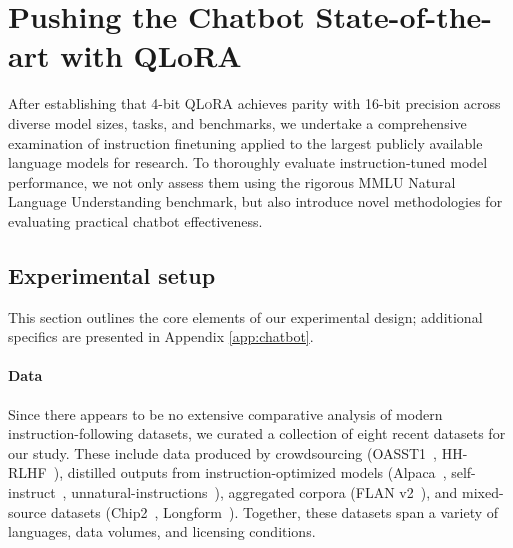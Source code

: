 \section{Pushing the Chatbot State-of-the-art with QLoRA}
\label{sec:pushing}
After establishing that 4-bit \textsc{QLoRA} achieves parity with 16-bit precision across diverse model sizes, tasks, and benchmarks, we undertake a comprehensive examination of instruction finetuning applied to the largest publicly available language models for research. To thoroughly evaluate instruction-tuned model performance, we not only assess them using the rigorous MMLU Natural Language Understanding benchmark, but also introduce novel methodologies for evaluating practical chatbot effectiveness.

\subsection{Experimental setup} This section outlines the core elements of our experimental design; additional specifics are presented in Appendix \ref{app:chatbot}.

\paragraph{Data} Since there appears to be no extensive comparative analysis of modern instruction-following datasets, we curated a collection of eight recent datasets for our study. These include data produced by crowdsourcing (OASST1~\citep{kopf2023openassistant}, HH-RLHF~\citep{bai2022training}), distilled outputs from instruction-optimized models (Alpaca~\citep{alpaca}, self-instruct~\citep{wang2022self}, unnatural-instructions~\citep{honovich2022unnatural}), aggregated corpora (FLAN v2~\citep{chung2022scaling}), and mixed-source datasets (Chip2~\citep{laion2023}, Longform~\citep{koksal2023longform}). Together, these datasets span a variety of languages, data volumes, and licensing conditions.


